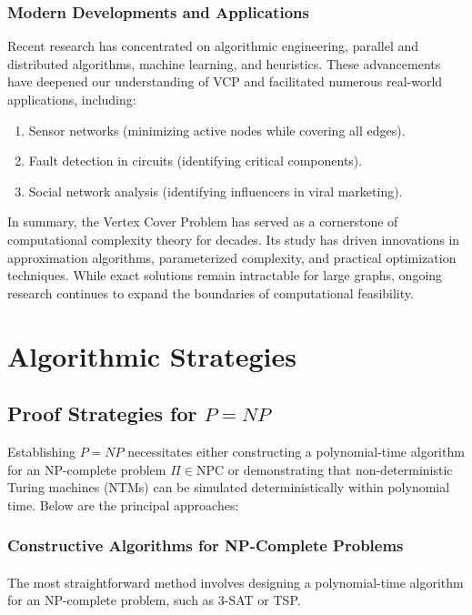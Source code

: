 \documentclass[acmsmall]{acmart}
\begin{document}
	\subsubsection{Modern Developments and Applications}
	
	\hspace{1.2em}Recent research has concentrated on algorithmic engineering, parallel and distributed algorithms, machine learning, and heuristics. These advancements have deepened our understanding of VCP and facilitated numerous real-world applications, including:
	\begin{enumerate}
		\item Sensor networks (minimizing active nodes while covering all edges).
		\item Fault detection in circuits (identifying critical components).
		\item Social network analysis (identifying influencers in viral marketing).
	\end{enumerate}
	
	In summary, the Vertex Cover Problem has served as a cornerstone of computational complexity theory for decades. Its study has driven innovations in approximation algorithms, parameterized complexity, and practical optimization techniques. While exact solutions remain intractable for large graphs, ongoing research continues to expand the boundaries of computational feasibility.
	
	\section{Algorithmic Strategies}
	\subsection{Proof Strategies for \( P = NP \)}
	
	Establishing \( P = NP \) necessitates either constructing a polynomial-time algorithm for an NP-complete problem \( \Pi \in \text{NPC} \) or demonstrating that non-deterministic Turing machines (NTMs) can be simulated deterministically within polynomial time. Below are the principal approaches:
	
	\subsubsection{Constructive Algorithms for NP-Complete Problems}
	\paragraph{}\hspace{0.8em}The most straightforward method involves designing a polynomial-time algorithm for an NP-complete problem, such as 3-SAT or TSP.
	
\end{document}
